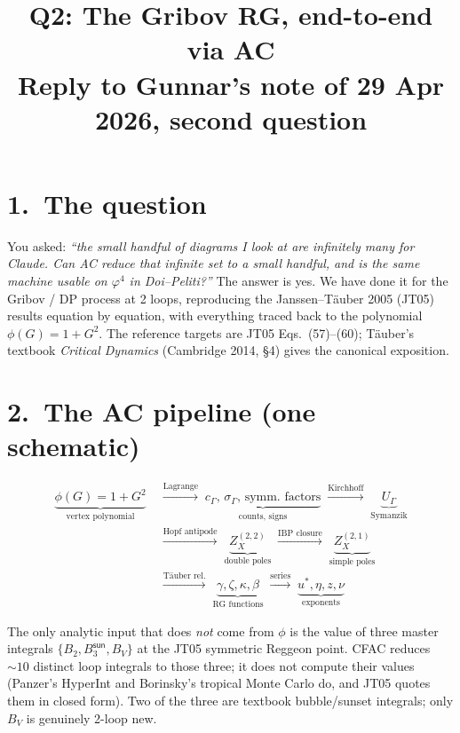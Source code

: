 \documentclass[11pt,a4paper]{article}
\title{\large Q2: The Gribov RG, end-to-end via AC\\[2pt]
\normalsize Reply to Gunnar's note of 29 Apr 2026, second question}
\author{}
\date{}
\begin{document}
\maketitle
\vspace{-2em}

\section*{1.\ The question}

You asked: \emph{``the small handful of diagrams I look at are infinitely many for Claude. Can AC reduce that infinite set to a small handful, and is the same machine usable on $\varphi^4$ in Doi--Peliti?''} The answer is yes. We have done it for the Gribov / DP process at 2 loops, reproducing the Janssen--T\"auber 2005 (JT05) results equation by equation, with everything traced back to the polynomial $\phi(G) = 1 + G^2$. The reference targets are JT05 Eqs.~(57)--(60); T\"auber's textbook \emph{Critical Dynamics} (Cambridge 2014, §4) gives the canonical exposition.

\section*{2.\ The AC pipeline (one schematic)}

\begin{align*}
\underbrace{\phi(G) = 1{+}G^2}_{\text{vertex polynomial}}
&\;\xrightarrow{\text{Lagrange}}\;
\underbrace{c_\Gamma,\,\sigma_\Gamma,\,\text{symm.\ factors}}_{\text{counts, signs}}
\;\xrightarrow{\text{Kirchhoff}}\;
\underbrace{U_\Gamma}_{\text{Symanzik}}\\[4pt]
&\;\xrightarrow{\text{Hopf antipode}}\;
\underbrace{Z_X^{(2,2)}}_{\text{double poles}}
\;\xrightarrow{\text{IBP closure}}\;
\underbrace{Z_X^{(2,1)}}_{\text{simple poles}}\\[4pt]
&\;\xrightarrow{\text{T\"auber rel.}}\;
\underbrace{\gamma,\zeta,\kappa,\beta}_{\text{RG functions}}
\;\xrightarrow{\text{series}}\;
\underbrace{u^*,\eta,z,\nu}_{\text{exponents}}
\end{align*}

The only analytic input that does \emph{not} come from $\phi$ is the value of three master integrals $\{B_2, B_3^{\textsf{sun}}, B_V\}$ at the JT05 symmetric Reggeon point. CFAC reduces $\sim\!10$ distinct loop integrals to those three; it does not compute their values (Panzer's HyperInt and Borinsky's tropical Monte Carlo do, and JT05 quotes them in closed form). Two of the three are textbook bubble/sunset integrals; only $B_V$ is genuinely 2-loop new.
\end{document}
